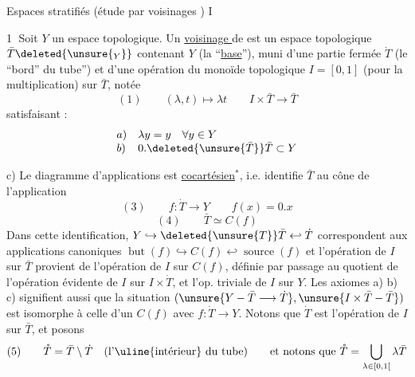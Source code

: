 Espaces stratifiés (étude par voisinages 
)
\textcircled{I}

\textcircled{1} Soit $Y$ un espace topologique. Un \uline{voisinage } 
 de 
 est un espace topologique
$\bar T\deleted{\unsure{_Y}}$ contenant $Y$
(la ``\uline{base}''), muni d'une partie fermée $\dot T$
(le ``bord'' du tube'') et d'une opération du monoïde topologique
$I=[0,1]$ (pour la multiplication) sur $\bar T$, notée
\[
(1)\qquad (\lambda,t)\longmapsto\lambda t
\qquad I\times\bar T\longrightarrow\bar T
\]
satisfaisant :
\[
\begin{array}{ll}
a)&\lambda y=y\quad\forall y\in Y\\
b)&0.\deleted{\unsure{\bar T}}\bar T\subset Y
\end{array}
\]

c) Le  diagramme d'applications
est \uline{cocartésien}$^{*}$, i.e. identifie $\bar T$ au cône de l'application
\[
(3)\qquad f:\dot T\longrightarrow Y\qquad f(x)=0.x
\]
\margin{$^{*}$ Cela signifie que
$]0,1]\times\dot T\xrightarrow[\sim]{\mathrm{bij.}}\bar T\setminus Y$
et qu'une partie de $\bar T$ est ouverte ssi
\deleted{\unsure{son intersection}} \inserted{\unsure{ses images}}
\unsure{dans $Y$ et ses images dans $I\times\dot T$}.}
\[
(4)\qquad \bar T\simeq C(f)
\]
Dans cette identification, $Y\hookrightarrow\deleted{\unsure{T}}\bar T
\hookleftarrow\dot T$ correspondent
aux applications canoniques 
$\operatorname{but}(f)\hookrightarrow C(f)\hookleftarrow
\operatorname{source}(f)$
et l'opération de $I$ sur $\bar T$ provient de l'opération de
$I$ sur $C(f)$, définie par passage au quotient de
l'opération évidente de $I$ sur $I\times\dot T$, et l'op. triviale
de $I$ sur $Y$. Les axiomes a) b) c) signifient
aussi que la situation $(\unsure{Y-\bar T\longrightarrow\dot T},
\unsure{I\times\bar T-\bar T})$
est isomorphe à celle d'un $C(f)$ avec $f:\dot T\longrightarrow Y$.
Notons que $\dot T$ est  l'opération
de $I$ sur $\bar T$,  et posons
\[
(5)\qquad \mathring T=\bar T\setminus\dot T
\quad\text{(l'\uline{intérieur} du tube)}
\qquad\text{et notons que }\mathring T=\bigcup_{\lambda\in[0,1[}\lambda\bar T
\]
